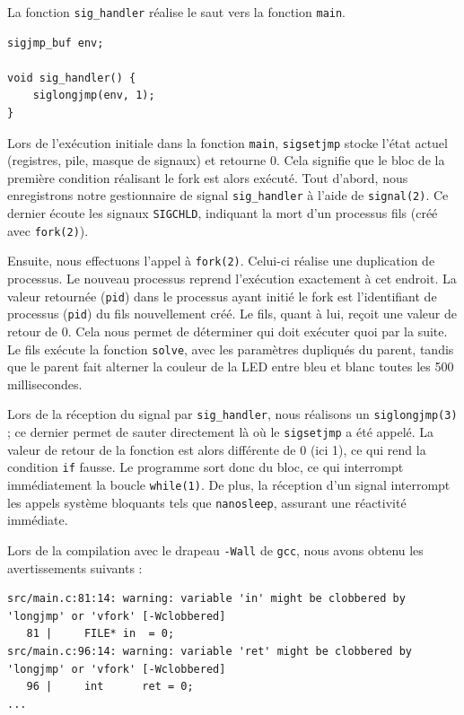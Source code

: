 \documentclass[a4paper,11pt]{article}
\begin{document}
La fonction \texttt{sig\_handler} réalise le saut vers la fonction \texttt{main}.

\begin{verbatim}
sigjmp_buf env;

void sig_handler() {
    siglongjmp(env, 1);
}
\end{verbatim}

Lors de l'exécution initiale dans la fonction \texttt{main}, \texttt{sigsetjmp} stocke l'état actuel (registres, pile, masque de signaux) et retourne $0$. Cela signifie que le bloc de la première condition réalisant le fork est alors exécuté. Tout d'abord, nous enregistrons notre gestionnaire de signal \texttt{sig\_handler} à l'aide de \texttt{signal(2)}. Ce dernier écoute les signaux \texttt{SIGCHLD}, indiquant la mort d'un processus fils (créé avec \texttt{fork(2)}).

Ensuite, nous effectuons l'appel à \texttt{fork(2)}. Celui-ci réalise une duplication de processus. Le nouveau processus reprend l'exécution exactement à cet endroit. La valeur retournée (\texttt{pid}) dans le processus ayant initié le fork est l'identifiant de processus (\texttt{pid}) du fils nouvellement créé. Le fils, quant à lui, reçoit une valeur de retour de $0$. Cela nous permet de déterminer qui doit exécuter quoi par la suite. Le fils exécute la fonction \texttt{solve}, avec les paramètres dupliqués du parent, tandis que le parent fait alterner la couleur de la LED entre bleu et blanc toutes les 500 millisecondes.

Lors de la réception du signal par \texttt{sig\_handler}, nous réalisons un \texttt{siglongjmp(3)} ; ce dernier permet de sauter directement là où le \texttt{sigsetjmp} a été appelé. La valeur de retour de la fonction est alors différente de $0$ (ici 1), ce qui rend la condition \texttt{if} fausse. Le programme sort donc du bloc, ce qui interrompt immédiatement la boucle \texttt{while(1)}. De plus, la réception d'un signal interrompt les appels système bloquants tels que \texttt{nanosleep}, assurant une réactivité immédiate.

Lors de la compilation avec le drapeau \texttt{-Wall} de \texttt{gcc}, nous avons obtenu les avertissements suivants :

\begin{verbatim}
src/main.c:81:14: warning: variable 'in' might be clobbered by 'longjmp' or 'vfork' [-Wclobbered]
   81 |     FILE* in  = 0;
src/main.c:96:14: warning: variable 'ret' might be clobbered by 'longjmp' or 'vfork' [-Wclobbered]
   96 |     int      ret = 0;
...
\end{verbatim}
\end{document}
